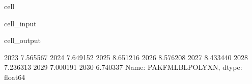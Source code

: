 \documentclass[letterpaper,10pt,english]{jupyterBook}
\begin{document}
\begin{sphinxuseclass}{cell}\begin{sphinxVerbatimInput}

\begin{sphinxuseclass}{cell_input}
\begin{sphinxVerbatim}[commandchars=\\\{\}]

 



\PYG{p}{[}\PYG{p}{]}
\end{sphinxVerbatim}

\end{sphinxuseclass}\end{sphinxVerbatimInput}
\begin{sphinxVerbatimOutput}

\begin{sphinxuseclass}{cell_output}
\begin{sphinxVerbatim}[commandchars=\\\{\}]
2023    7.565567
2024    7.649152
2025    8.651216
2026    8.576208
2027    8.433440
2028    7.236313
2029    7.000191
2030    6.740337
Name: PAKFMLBLPOLYXN, dtype: float64
\end{sphinxVerbatim}

\end{sphinxuseclass}\end{sphinxVerbatimOutput}

\end{sphinxuseclass}
\end{document}
